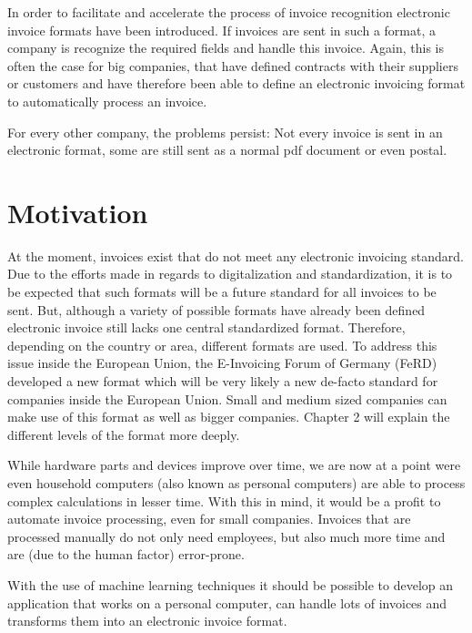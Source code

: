 In order to facilitate and accelerate the process of invoice recognition electronic invoice formats have been introduced. If invoices are sent in such a format, a company is recognize the required fields and handle this invoice. Again, this is often the case for big companies, that have defined contracts with their suppliers or customers and have therefore been able to define an electronic invoicing format to automatically process an invoice.

For every other company, the problems persist: Not every invoice is sent in an electronic format, some are still sent as a normal pdf document or even postal.

\section{Motivation}
\label{sec1.2}

At the moment, invoices exist that do not meet any electronic invoicing standard. Due to the efforts made in regards to digitalization and standardization, it is to be expected that such formats will be a future standard for all invoices to be sent. But, although a variety of possible formats have already been defined electronic invoice still lacks one central standardized format.
Therefore, depending on the country or area, different formats are used. To address this issue inside the European Union, the E-Invoicing Forum of Germany (FeRD) developed a new format which will be very likely a new de-facto standard for companies inside the European Union. Small and medium sized companies can make use of this format as well as bigger companies. Chapter 2 will explain the different levels of the format more deeply.

While hardware parts and devices improve over time, we are now at a point were even household computers (also known as personal computers) are able to process complex calculations in lesser time. With this in mind, it would be a profit to automate invoice processing, even for small companies. Invoices that are processed manually do not only need employees, but also much more time and are (due to the human factor) error-prone. 

With the use of machine learning techniques it should be possible to develop an application that works on a personal computer, can handle lots of invoices and transforms them into an electronic invoice format.

